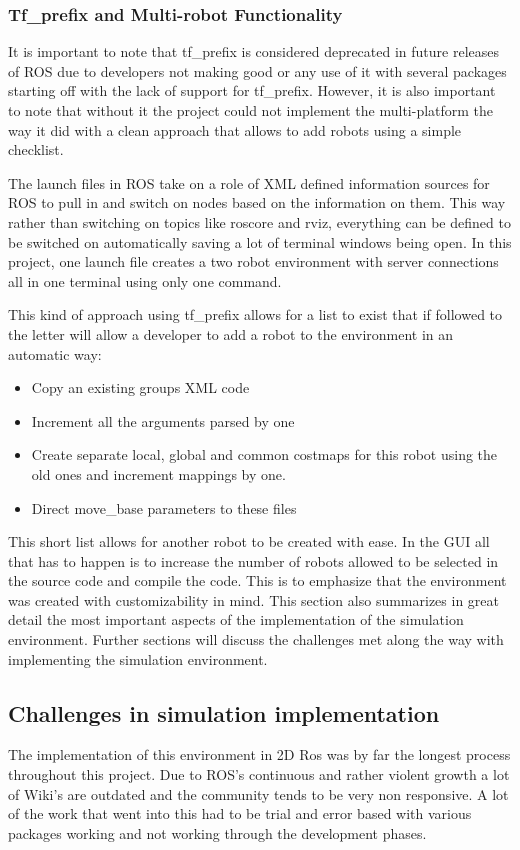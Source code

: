     \subsubsection{Tf\_prefix and Multi-robot Functionality}
      It is important to note that tf\_prefix is considered deprecated in future releases of ROS due to developers not making good or any use of it with several packages starting off with the lack of support for tf\_prefix. However, it is also important to note that without it the project could not implement the multi-platform the way it did with a clean approach that allows to add robots using a simple checklist.

      The launch files in ROS take on a role of XML defined information sources for ROS to pull in and switch on nodes based on the information on them. This way rather than switching on topics like roscore and rviz, everything can be defined to be switched on automatically saving a lot of terminal windows being open. In this project, one launch file creates a two robot environment with server connections all in one terminal using only one command.

      This kind of approach using tf\_prefix allows for a list to exist that if followed to the letter will allow a developer to add a robot to the environment in an automatic way:
        \begin{itemize}
          \item Copy an existing groups XML code
          \item Increment all the arguments parsed by one
          \item Create separate local, global and common costmaps for this robot using the old ones and increment mappings by one.
          \item Direct move\_base parameters to these files
        \end{itemize}

      This short list allows for another robot to be created with ease. In the GUI all that has to happen is to increase the number of robots allowed to be selected in the source code and compile the code. This is to emphasize that the environment was created with customizability in mind. This section also summarizes in great detail the most important aspects of the implementation of the simulation environment. Further sections will discuss the challenges met along the way with implementing the simulation environment.

    \subsection{Challenges in simulation implementation}
      The implementation of this environment in 2D Ros was by far the longest process throughout this project. Due to ROS's continuous and rather violent growth a lot of Wiki's are outdated and the community tends to be very non responsive. A lot of the work that went into this had to be trial and error based with various packages working and not working through the development phases.

